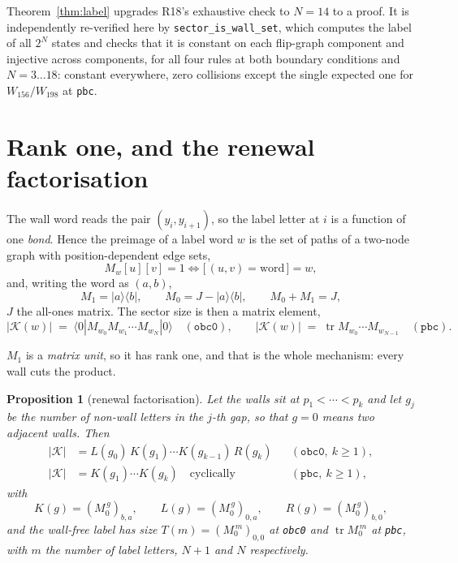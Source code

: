 \documentclass[11pt]{article}
\newcommand{\rt}[1]{\texttt{#1}}
\newcommand{\fn}[1]{\texttt{#1}}
\newcommand{\K}{\mathcal{K}}
\theoremstyle{plain}
\newtheorem{proposition}{Proposition}
\theoremstyle{remark}
\begin{document}
\noindent Theorem~\ref{thm:label} upgrades R18's exhaustive check to $N=14$ to a
proof. It is independently re-verified here by \fn{sector\_is\_wall\_set}, which
computes the label of all $2^N$ states and checks that it is constant on each
flip-graph component and injective across components, for all four rules at both
boundary conditions and $N=3\ldots18$: constant everywhere, zero collisions
except the single expected one for $W_{156}/W_{198}$ at \rt{pbc}.

\section{Rank one, and the renewal factorisation}

The wall word reads the pair $(y_i,y_{i+1})$, so the label letter at $i$ is a
function of one \emph{bond}. Hence the preimage of a label word $w$ is the set
of paths of a two-node graph with position-dependent edge sets,
\[
M_w[u][v] = 1 \iff \bigl[\,(u,v)=\text{word}\,\bigr]=w ,
\]
and, writing the word as $(a,b)$,
\begin{equation}
\label{eq:mats}
M_1 = |a\rangle\langle b| , \qquad M_0 = J - |a\rangle\langle b| ,
\qquad M_0+M_1 = J ,
\end{equation}
$J$ the all-ones matrix. The sector size is then a matrix element,
\[
|\K(w)| \;=\; \langle 0| M_{w_0}M_{w_1}\cdots M_{w_N} |0\rangle \quad(\rt{obc0}),
\qquad
|\K(w)| \;=\; \operatorname{tr} M_{w_0}\cdots M_{w_{N-1}} \quad(\rt{pbc}).
\]

\noindent $M_1$ is a \emph{matrix unit}, so it has rank one, and that is the
whole mechanism: every wall cuts the product.

\begin{proposition}[renewal factorisation]
\label{prop:renewal}
Let the walls sit at $p_1<\cdots<p_k$ and let $g_j$ be the number of non-wall
letters in the $j$-th gap, so that $g=0$ means two adjacent walls. Then
\begin{align}
|\K| &= L(g_0)\,K(g_1)\cdots K(g_{k-1})\,R(g_k) &&(\rt{obc0},\ k\ge1),\\
|\K| &= K(g_1)\cdots K(g_k) \quad\text{cyclically} &&(\rt{pbc},\ k\ge1),
\end{align}
with
\[
K(g)=(M_0^{\,g})_{b,a},\qquad L(g)=(M_0^{\,g})_{0,a},\qquad
R(g)=(M_0^{\,g})_{b,0},
\]
and the wall-free label has size $T(m)=(M_0^{\,m})_{0,0}$ at \rt{obc0} and
$\operatorname{tr}M_0^{\,m}$ at \rt{pbc}, with $m$ the number of label letters,
$N+1$ and $N$ respectively.
\end{proposition}
\end{document}
